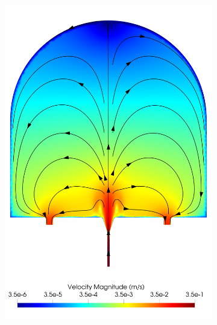             \begin{figure}
                \centering
                \begin{subfigure}[b]{0.45\textwidth}
                    \centering
                    \includegraphics[width=\textwidth]{diagrams/results-modelling/velocity-transport/meshandsoln_dg_velocity_placentone_nsb_velocity-log.png}
                    \caption{}
                    \label{fig:4-models-placentone:nsb}
                \end{subfigure}
                \hfill
                \begin{subfigure}[b]{0.45\textwidth}
                    \centering

\end{subfigure}
\end{figure}
